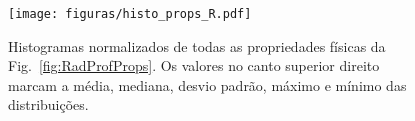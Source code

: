 \begin{figure}
	\centering
	\texttt{[image: figuras/histo\_props\_R.pdf]}
	\caption[Histogramas dos perfis radiais das propriedades físicas]
	{Histogramas normalizados de todas as propriedades físicas da Fig.\ \ref{fig:RadProfProps}. Os
valores no canto superior direito marcam a média, mediana, desvio padrão, máximo e mínimo das
distribuições.}
	\label{fig:HistoRadProfProps}
\end{figure}

